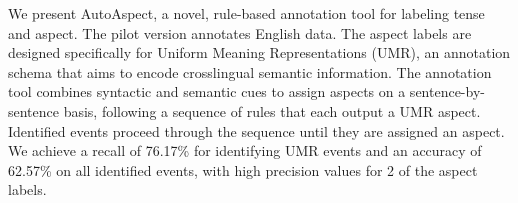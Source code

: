 We present AutoAspect, a novel, rule-based annotation tool for labeling tense and aspect. The pilot version annotates English data. The aspect labels are designed specifically for Uniform Meaning Representations (UMR), an annotation schema that aims to encode crosslingual semantic information. The annotation tool combines syntactic and semantic cues to assign aspects on a sentence-by-sentence basis, following a sequence of rules that each output a UMR aspect. Identified events proceed through the sequence until they are assigned an aspect. We achieve a recall of 76.17\% for identifying UMR events and an accuracy of 62.57\% on all identified events, with high precision values for 2 of the aspect labels.
